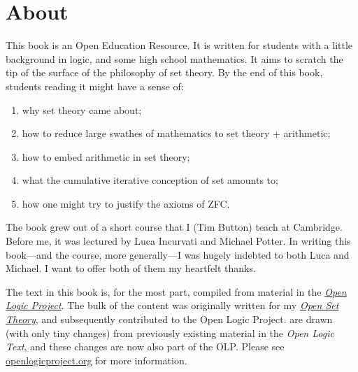 \chapter*{About}

This book is an Open Education Resource. It is written for students
with a little background in logic, and some high school mathematics.
It aims to scratch the tip of the surface of the philosophy of set
theory. By the end of this book, students reading it might have a
sense of:
\begin{enumerate}
	\item why set theory came about; 
	\item how to reduce large swathes of mathematics to set theory + arithmetic;
	\item how to embed arithmetic in set theory;
	\item what the cumulative iterative conception of set amounts to;
	\item how one might try to justify the axioms of ZFC.
\end{enumerate}
The book grew out of a short course that I (Tim Button) teach at
Cambridge. Before me, it was lectured by Luca Incurvati and Michael
Potter. In writing this book---and the course, more generally---I was
hugely indebted to both Luca and Michael. I want to offer both of them
my heartfelt thanks.

The text in this book is, for the most part, compiled from material in
the \href{http://openlogicproject.org}{\emph{Open Logic Project}}. The
bulk of the content was originally written for my 
\href{http://people.ds.cam.ac.uk/tecb2/opensettheory.shtml}{\emph{Open
Set Theory}}, and subsequently contributed to the Open Logic Project.
 are drawn (with only tiny
changes) from previously existing material in the \emph{Open Logic
Text}, and these changes are now also part of the OLP. Please see
\href{http://openlogicproject.org/}{openlogicproject.org} for more
information.